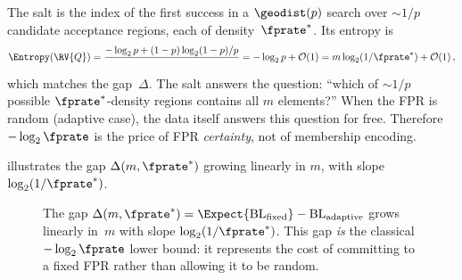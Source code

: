\begin{remark}
\label{rem:info_interp}
The salt is the index of the first success in a $\geodist(p)$ search over
$\sim\!1/p$ candidate acceptance regions, each of density~$\fprate^*$.
Its entropy is
\begin{equation}
    \Entropy(\RV{Q})
    = \frac{-\log_2 p + (1-p)\log_2(1-p)/p}{\phantom{x}}
    = -\log_2 p + \mathcal{O}(1)
    = m \log_2(1/\fprate^*) + \mathcal{O}(1)\,,
\end{equation}
which matches the gap~$\Delta$.
The salt answers the question: ``which of $\sim\!1/p$ possible
$\fprate^*$-density regions contains all $m$ elements?''
When the FPR is random (adaptive case), the data itself answers this
question for free.
Therefore $-\log_2 \fprate$ is the price of FPR \emph{certainty}, not of
membership encoding.
\end{remark}

 illustrates the gap $\Delta(m, \fprate^*)$
growing linearly in $m$, with slope $\log_2(1/\fprate^*)$.

\begin{figure}[ht]
\centering
{}
\caption{The gap $\Delta(m, \fprate^*) =
    \Expect{\mathrm{BL}_{\mathrm{fixed}}} - \mathrm{BL}_{\mathrm{adaptive}}$
    grows linearly in~$m$ with slope $\log_2(1/\fprate^*)$.
    This gap \emph{is} the classical $-\log_2\fprate$ lower bound: it
    represents the cost of committing to a fixed FPR rather than allowing
    it to be random.}
\label{fig:price_certainty}
\end{figure}

